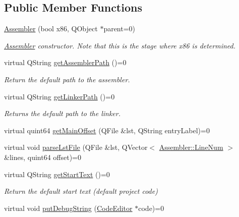 \subsection*{Public Member Functions}
\begin{DoxyCompactItemize}
\item 
\hyperlink{class_assembler_aae6b7e0ee43e80cfbb0a0a130c1c476a}{Assembler} (bool x86, Q\+Object $\ast$parent=0)
\begin{DoxyCompactList}\small\item\em \hyperlink{class_assembler}{Assembler} constructor. Note that this is the stage where x86 is determined. \end{DoxyCompactList}\item 
\hypertarget{class_assembler_a0e5d1d3170d03c044a5d759267f31aa6}{}virtual Q\+String \hyperlink{class_assembler_a0e5d1d3170d03c044a5d759267f31aa6}{get\+Assembler\+Path} ()=0\label{class_assembler_a0e5d1d3170d03c044a5d759267f31aa6}

\begin{DoxyCompactList}\small\item\em Return the default path to the assembler. \end{DoxyCompactList}\item 
\hypertarget{class_assembler_a22e4678516dd765bc716915616b76ab9}{}virtual Q\+String \hyperlink{class_assembler_a22e4678516dd765bc716915616b76ab9}{get\+Linker\+Path} ()=0\label{class_assembler_a22e4678516dd765bc716915616b76ab9}

\begin{DoxyCompactList}\small\item\em Returns the default path to the linker. \end{DoxyCompactList}\item 
virtual quint64 \hyperlink{class_assembler_aa41f46e0cd774718d84bf4e5bd9c65b7}{get\+Main\+Offset} (Q\+File \&lst, Q\+String entry\+Label)=0
\item 
virtual void \hyperlink{class_assembler_aa724d277157a407d4d7fd3d0a23e84a7}{parse\+Lst\+File} (Q\+File \&lst, Q\+Vector$<$ \hyperlink{struct_assembler_1_1_line_num}{Assembler\+::\+Line\+Num} $>$ \&lines, quint64 offset)=0
\item 
\hypertarget{class_assembler_ace2439eeb3d887d279c3946df67f2525}{}virtual Q\+String \hyperlink{class_assembler_ace2439eeb3d887d279c3946df67f2525}{get\+Start\+Text} ()=0\label{class_assembler_ace2439eeb3d887d279c3946df67f2525}

\begin{DoxyCompactList}\small\item\em Return the default start text (default project code) \end{DoxyCompactList}\item 
\hypertarget{class_assembler_a3d699b729df36103f37a8ac45d54a0a6}{}virtual void \hyperlink{class_assembler_a3d699b729df36103f37a8ac45d54a0a6}{put\+Debug\+String} (\hyperlink{class_code_editor}{Code\+Editor} $\ast$code)=0\label{class_assembler_a3d699b729df36103f37a8ac45d54a0a6}


\end{DoxyCompactItemize}
